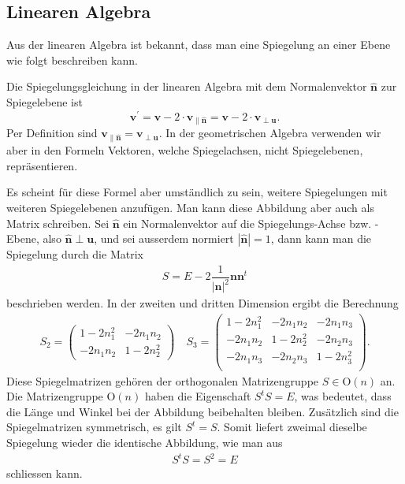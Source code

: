 \subsection{Linearen Algebra}
Aus der linearen Algebra ist bekannt, dass man eine Spiegelung an einer Ebene wie folgt beschreiben kann.
\begin{definition}
	Die Spiegelungsgleichung in der linearen Algebra mit dem Normalenvektor $\mathbf{\hat{n}}$ zur Spiegelebene ist
	\begin{equation} \label{RefLinAlg}
		\mathbf{v^{'}} = \mathbf{v} - 2 \cdot \mathbf{v_{\parallel \hat{n}}} = \mathbf{v} - 2 \cdot \mathbf{v_{\perp u}}.
	\end{equation}
	Per Definition sind $\mathbf{v_{\parallel \hat{n}}} = \mathbf{v_{\perp u}}$. In der geometrischen Algebra verwenden wir aber in den Formeln Vektoren, welche Spiegelachsen, nicht Spiegelebenen, repräsentieren.
\end{definition}
Es scheint für diese Formel aber umständlich zu sein, weitere Spiegelungen mit weiteren Spiegelebenen anzufügen. Man kann diese Abbildung aber auch als Matrix schreiben. Sei $\mathbf{\hat{n}}$ ein Normalenvektor auf die Spiegelungs-Achse bzw. -Ebene, also $\mathbf{\hat{n}}\perp \mathbf{u}$, und sei ausserdem normiert $|\mathbf{\hat{n}}| = 1$, dann kann man die Spiegelung durch die Matrix
\begin{align}
	S = E - 2\dfrac{1}{|\mathbf{n}|^2}\mathbf{nn}^t
\end{align}
beschrieben werden. In der zweiten und dritten Dimension ergibt die Berechnung
\begin{align} \label{Spiegelmatrizen}
	S_2 = \begin{pmatrix}
		1-2n_1^2 & -2n_1n_2 \\
		-2n_1n_2 & 1-2n_2^2
	\end{pmatrix} \quad
	S_3 = \begin{pmatrix}
		1-2n_1^2 & -2n_1n_2 & -2n_1n_3\\
		-2n_1n_2 & 1-2n_2^2 & -2n_2n_3\\
		-2n_1n_3 & -2n_2n_3 & 1-2n_3^2\\
	\end{pmatrix}.
\end{align}
Diese Spiegelmatrizen gehören der orthogonalen Matrizengruppe $S\in \text{O}(n)$ an. Die Matrizengruppe $\text{O}(n)$ haben die Eigenschaft $S^t S = E$, was bedeutet, dass die Länge und Winkel bei der Abbildung beibehalten bleiben. Zusätzlich sind die Spiegelmatrizen symmetrisch, es gilt $S^t = S$. Somit liefert zweimal dieselbe Spiegelung wieder die identische Abbildung, wie man aus
\begin{align}
	S^t S = S^2 = E
\end{align}
schliessen kann.

